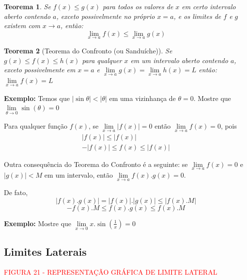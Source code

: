 \documentclass[oneside,a4paper,12pt]{article}
\newtheorem{theorem}{Teorema}[section]
\begin{document}
\begin{theorem}
	Se $f(x) \leq g(x)$ para todos os valores de $x$ em certo intervalo aberto contendo $a$, exceto possivelmente no próprio $x=a$, e os limites de $f$ e $g$ existem com $x \rightarrow a$, então:
	$$\lim\limits_{x \rightarrow a}f(x) \leq \lim\limits_{x \rightarrow a}g(x)$$
\end{theorem}

\begin{theorem}[Teorema do Confronto (ou Sanduíche)]
	Se $g(x) \leq f(x) \leq h(x)$ para qualquer $x$ em um intervalo aberto contendo $a$, exceto possivelmente em $x = a$ e $\lim\limits_{x \rightarrow a}g(x) = \lim\limits_{x \rightarrow a}h(x) = L$ então: $\lim\limits_{x \rightarrow a}f(x) = L$
\end{theorem}

{\bf Exemplo: }Temos que $|\sin \theta| < |\theta|$ em uma vizinhança de $\theta = 0$. Mostre que $\lim\limits_{\theta \rightarrow 0}\sin(\theta) = 0$

\vspace{200pt}

Para qualquer função $f(x)$, se $\lim\limits_{x \rightarrow a}|f(x)| = 0$ então $\lim\limits_{x \rightarrow a}f(x) = 0$, pois
\begin{eqnarray*}
|f(x)|  \leq  |f(x)| \\
-|f(x)| \leq  f(x)  \leq |f(x)| 
\end{eqnarray*}

Outra consequência do Teorema do Confronto é a seguinte: se $\lim\limits_{x \rightarrow a}f(x) = 0$ e $|g(x)|<M$ em um intervalo, então $\lim\limits_{x \rightarrow a}f(x).g(x) = 0$.

De fato,
$$|f(x).g(x)| = |f(x)|.|g(x)| \leq |f(x).M|$$
$$ -f(x).M \leq f(x).g(x) \leq f(x).M$$

{\bf Exemplo: } Mostre que $\lim\limits_{x \rightarrow 0}x.\sin(\frac{1}{x}) = 0$

\vspace{200pt}
 
\subsection{Limites Laterais}

\vspace{140pt}
\begin{center}
	\textcolor{red}{FIGURA 21 - REPRESENTAÇÃO GRÁFICA DE LIMITE LATERAL}
\end{center}
\end{document}
